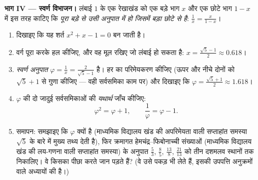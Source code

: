 \begin{problem}[{सप्ताहांत समस्या --- योग-और-गुणनफल की समस्याएँ, अल-ख़्वारिज़्मी
के खींचे चित्र के अनुसार वर्ग पूरा करना, और समीकरण $x^2 = x + 1$}]
\medskip
\noindent\textbf{भाग IV --- स्वर्ण विभाजन।}
लंबाई $1$ के एक रेखाखंड को एक बड़े भाग $x$ और एक छोटे भाग $1 - x$ में
इस तरह काटिए कि \emph{पूरा बड़े से उसी अनुपात में हो जिसमें बड़ा छोटे से
है}: $\frac{1}{x} = \frac{x}{1 - x}$।
\begin{enumerate}[resume]
  \item दिखाइए कि यह शर्त $x^2 + x - 1 = 0$ बन जाती है।
  \item वर्ग पूरा करके हल कीजिए, और वह मूल रखिए जो लंबाई हो सकता है: $x = \frac{\sqrt5 - 1}{2} \approx 0.618$।
  \item \emph{स्वर्ण अनुपात} $\varphi = \frac1x = \frac{2}{\sqrt5 - 1}$ है। हर का परिमेयकरण कीजिए (ऊपर और नीचे
        दोनों को $\sqrt5 + 1$ से गुणा कीजिए --- वही सर्वसमिका काम पर) और दिखाइए
        कि $\varphi = \frac{\sqrt5 + 1}{2} \approx 1.618$।
  \item $\varphi$ की दो जादुई सर्वसमिकाओं की \emph{यथार्थ} जाँच कीजिए:
        \[
        \varphi^2 = \varphi + 1,
        \qquad
        \frac{1}{\varphi} = \varphi - 1 .
        \]
  \item समापन: समझाइए कि $\varphi$  क्यों है (माध्यमिक विद्यालय खंड की
        अपरिमेयता वाली सप्ताहांत समस्या $\sqrt5$ के बारे में मुख्य तथ्य देती
        है), फिर क्रमागत हेमचंद्र--फिबोनाच्ची संख्याओं (माध्यमिक विद्यालय
        खंड की लय-गणना वाली सप्ताहांत समस्या) के अनुपात $\frac53$, $\frac85$,
        $\frac{13}{8}$, $\frac{21}{13}$ को तीन दशमलव स्थानों तक निकालिए। वे किसका पीछा करते
        जान पड़ते हैं? (वे उसे पकड़ भी लेते हैं, इसकी उपपत्ति अनुक्रमों
        वाले अध्यायों की है।)
\end{enumerate}
\end{problem}
